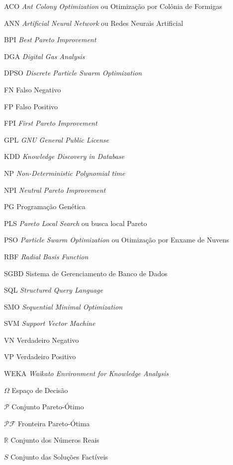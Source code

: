 \documentclass[
	12pt,				%
	openany,			%
	oneside,	
	a4paper,			%
	brazil,				%
	]{unimontes-ppgmsc-abntex2}
\begin{document}
\begin{siglas}
  \item[ACO]  {\em Ant Colony Optimization} ou Otimização por Colônia de Formigas
  \item[ANN]  {\em Artificial Neural Network} ou Redes Neurais Artificial
  \item[BPI]  {\em Best Pareto Improvement}
  \item[DGA]  {\em Digital Gas Analysis}
  \item[DPSO] {\em Discrete Particle Swarm Optimization}
  \item[FN]   Falso Negativo
  \item[FP]   Falso Positivo
  \item[FPI]  {\em First Pareto Improvement}
  \item[GPL]  {\em GNU General Public License}
  \item[KDD]  {\em Knowledge Discovery in Database}
  \item[NP]   {\em Non-Deterministic Polynomial time}
  \item[NPI]  {\em Neutral Pareto Improvement}
  \item[PG]   Programação Genética
  \item[PLS]  {\em Pareto Local Search} ou busca local Pareto
  \item[PSO]  {\em Particle Swarm Optimization} ou Otimização por Enxame de Nuvens
  \item[RBF]  {\em Radial Basis Function}
  \item[SGBD] Sistema de Gerenciamento de Banco de Dados
  \item[SQL]  {\em Structured Query Language}
  \item[SMO]  {\em Sequential Minimal Optimization}
  \item[SVM]  {\em Support Vector Machine}
  \item[VN]   Verdadeiro Negativo
  \item[VP]   Verdadeiro Positivo
  \item[WEKA] {\em Waikato Environment for Knowledge Analysis}
\end{siglas}

\begin{simbolos}
\item[$ \Omega $] Espaço de Decisão
\item[$ \mathcal{P} $] Conjunto Pareto-Ótimo
\item[$ \mathcal{PF} $] Fronteira Pareto-Ótima
\item[$ \mathbb{R} $] Conjunto dos Números Reais
\item[$ S $] Conjunto das Soluções Factíveis
\end{simbolos}
\end{document}
